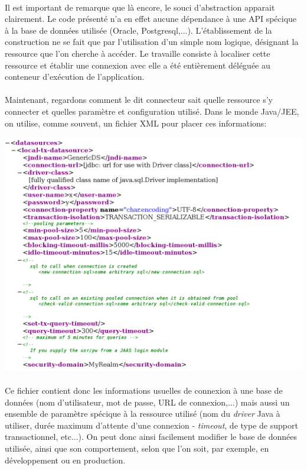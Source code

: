 {  \paragraph{} Il est important de remarque que là encore, le souci d'abstraction apparait
  clairement. Le code présenté n'a en effet aucune dépendance à une API spécique à la base de
  données utilisée (Oracle, Postgresql,...). L'établissement de la construction ne se fait que par
  l'utilisation d'un simple nom logique, désignant la ressource que l'on cherche à accéder. Le
  travaille consiste à localiser cette ressource et établir une connexion avec elle a été
  entièrement déléguée au conteneur d'exécution de l'application.

  \paragraph{} Maintenant, regardons comment le dit connecteur sait quelle ressource s'y connecter
  et quelles paramètre et configuration utilisé. Dans le monde Java/JEE, on utilise, comme souvent,
  un fichier XML pour placer ces informations:

  \begin{center}
    \includegraphics[scale=0.3]{img/datasource.png}
  \end{center}

  \paragraph{} Ce fichier contient donc les informations usuelles de connexion à une base de données
  (nom d'utilisateur, mot de passe, URL de connexion,...) mais aussi un ensemble de paramètre
  spécique à la ressource utilisé (nom du \textit{driver} Java à utiliser, durée maximum d'attente
  d'une connexion - \textit{timeout}, de type de support transactionnel, etc...). On peut donc ainsi
  facilement modifier le base de données utilisée, ainsi que son comportement, selon que l'on soit,
  par exemple, en développement ou en production.

}

